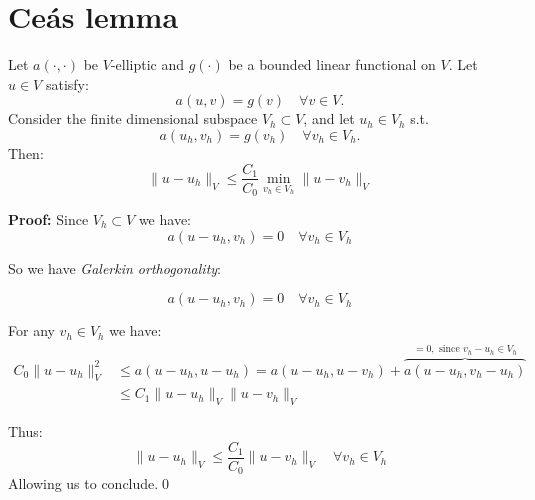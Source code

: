 \section*{Ceás lemma}

Let $a(\cdot, \cdot)$ be $V$-elliptic and $g(\cdot)$ be a bounded linear functional on $V$. Let $u \in V$ satisfy:
\[
    a(u, v) = g(v) \quad \forall v \in V.
\]
Consider the finite dimensional subspace $V_h \subset V$, and let $u_h \in V_h$ s.t.
\[
    a(u_h, v_h) = g(v_h) \quad \forall v_h \in V_h.
\]
Then:
\[
    \|u - u_h\|_V \leq \frac{C_1}{C_0} \min_{v_h \in V_h} \|u - v_h\|_V
\]

\textbf{Proof:}
Since $V_h \subset V$ we have:
\[
    a(u - u_h, v_h) = 0 \quad \forall v_h \in V_h
\]

So we have \emph{Galerkin orthogonality}:

\[
    a(u - u_h,v_h) = 0 \quad \forall v_h \in V_h
\]

For any $v_h \in V_h$ we have:
\begin{align*}
    C_0 \|u - u_h\|_V^2 & \leq a(u - u_h, u - u_h) \tag{coercivity} = a(u - u_h, u - v_h) + \overbrace{a(u - u_h, v_h - u_h)}^{= 0, \text{ since } v_h - u_h \in V_h} \\
                        & \leq C_1 \|u - u_h\|_V \|u - v_h\|_V \tag{continuity}
\end{align*}

Thus:
\[
    \|u - u_h\|_V \leq \frac{C_1}{C_0} \|u - v_h\|_V \quad \forall v_h \in V_h
\]
Allowing us to conclude.\qed